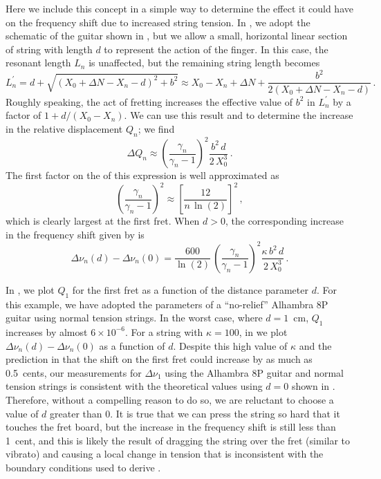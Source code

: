 Here we include this concept in a simple way to determine the effect it could have on the frequency shift due to increased string tension. In , we adopt the schematic of the guitar shown in , but we allow a small, horizontal linear section of string with length $d$ to represent the action of the finger. In this case, the resonant length $L_n$ is unaffected, but the remaining string length becomes
 \begin{equation}
L^\prime_n = d + \sqrt{\left(X_0 + \Delta N - X_n - d\right)^2 + b^2} \approx X_0 - X_n + \Delta N + \frac{b^2}{2 \left(X_0 + \Delta N - X_n - d\right)}\, .
 \end{equation}
Roughly speaking, the act of fretting increases the effective value of $b^2$ in $L^\prime_n$ by a factor of $1 + d / (X_0 - X_n)$. We can use this result and  to determine the increase in the relative displacement $Q_n$; we find
\begin{equation} \label{eqn:delta_q_n_approx}
    \Delta Q_n \approx \left(\frac{\gamma_n}{\gamma_n - 1}\right)^2 \frac{b^2\, d}{2\, X_0^3}\, .
\end{equation}
The first factor on the \rhs of this expression is well approximated as
\begin{equation}
    \left(\frac{\gamma_n}{\gamma_n - 1}\right)^2 \approx \left[\frac{12}{n\, \ln(2)}\right]^2\, ,
\end{equation}
which is clearly largest at the first fret. When $d > 0$, the corresponding increase in the frequency shift given by  is
\begin{equation} \label{eqn:delta_nu_n_d}
    \Delta \nu_n(d) - \Delta \nu_n(0) = \frac{600}{\ln(2)}\, \left(\frac{\gamma_n}{\gamma_n - 1}\right)^2 \frac{\kappa\, b^2\, d}{2\, X_0^3}\, .
\end{equation}

In , we plot $Q_1$ for the first fret as a function of the distance parameter $d$. For this example, we have adopted the parameters of a ``no-relief'' Alhambra 8P guitar using normal tension strings. In the worst case, where $d = 1$~cm, $Q_1$ increases by almost $6 \times 10^{-6}$. For a string with $\kappa = 100$, in  we plot $\Delta \nu_n(d) - \Delta \nu_n(0)$ as a function of $d$. Despite this high value of $\kappa$ and the prediction in  that the shift on the first fret could increase by as much as 0.5~cents, our measurements for $\Delta \nu_1$ using the Alhambra 8P guitar and normal tension strings is consistent with the theoretical values using $d = 0$ shown in . Therefore, without a compelling reason to do so, we are reluctant to choose a value of $d$ greater than 0. It is true that we can press the string so hard that it touches the fret board, but the increase in the frequency shift is still less than 1~cent, and this is likely the result of dragging the string over the fret (similar to vibrato) and causing a local change in tension that is inconsistent with the boundary conditions used to derive .

